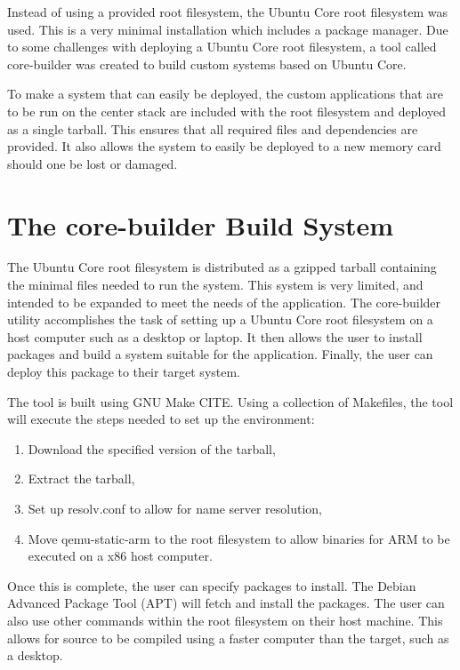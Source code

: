 \documentclass[ece]{uw-wkrpt}
\begin{document}
Instead of using a provided root filesystem, the Ubuntu Core root filesystem was
used. This is a very minimal installation which includes a package manager. Due
to some challenges with deploying a Ubuntu Core root filesystem, a tool called
core-builder was created to build custom systems based on Ubuntu Core.

To make a system that can easily be deployed, the custom applications that are
to be run on the center stack are included with the root filesystem and deployed
as a single tarball. This ensures that all required files and dependencies are
provided. It also allows the system to easily be deployed to a new memory card
should one be lost or damaged.

\section{The core-builder Build System}

The Ubuntu Core root filesystem is distributed as a gzipped tarball containing
the minimal files needed to run the system. This system is very limited, and
intended to be expanded to meet the needs of the application. The core-builder
utility accomplishes the task of setting up a Ubuntu Core root filesystem on a
host computer such as a desktop or laptop. It then allows the user to install
packages and build a system suitable for the application. Finally, the user can
deploy this package to their target system.

The tool is built using GNU Make CITE. Using a collection of Makefiles, the tool will
execute the steps needed to set up the environment:

\begin{enumerate}
  \item Download the specified version of the tarball,
  \item Extract the tarball,
  \item Set up resolv.conf to allow for name server resolution,
  \item Move qemu-static-arm to the root filesystem to allow binaries for ARM to
  be executed on a x86 host computer.
\end{enumerate}

Once this is complete, the user can specify packages to install. The Debian
Advanced Package Tool (APT) will fetch and install the packages. The user can
also use other commands within the root filesystem on their host machine. This
allows for source to be compiled using a faster computer than the target, such
as a desktop.
\end{document}
